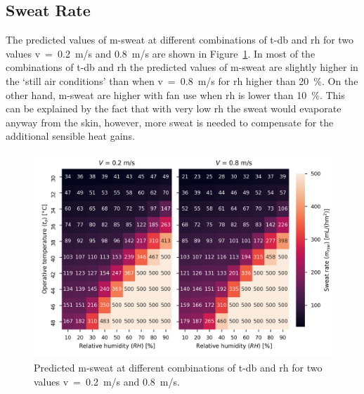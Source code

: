 %

\subsection{Sweat Rate}\label{subsec:sweat-rate}

The predicted values of \ac{m-sweat} at different combinations of \ac{t-db} and \ac{rh} for two values \acf{v}~=~0.2~m/s and 0.8~m/s are shown in Figure~\ref{fig:sweat_rate}.
In most of the combinations of \acf{t-db} and \acf{rh} the predicted values of \ac{m-sweat} are slightly higher in the `still air conditions' than when \ac{v}~=~0.8~m/s for \ac{rh} higher than 20~\%.
On the other hand, \ac{m-sweat} are higher with fan use when \ac{rh} is lower than 10~\%.
This can be explained by the fact that with very low \ac{rh} the sweat would evaporate anyway from the skin, however, more sweat is needed to compensate for the additional sensible heat gains.

\begin{figure}[thb!]
    \centering
    \includegraphics[width=\textwidth]{figures/sweat_rate}
    \caption{Predicted \acf{m-sweat} at different combinations of \acf{t-db} and \acf{rh} for two values \acf{v}~=~0.2~m/s and 0.8~m/s.}
    \label{fig:sweat_rate}
\end{figure}

